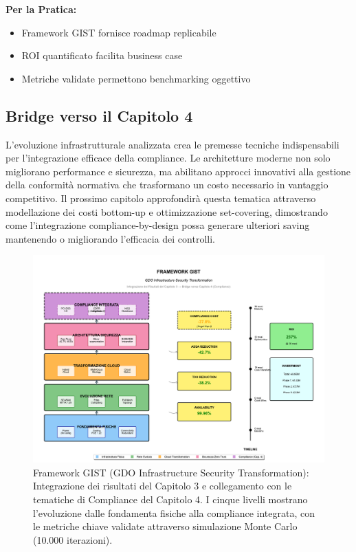 \textbf{Per la Pratica:}
\begin{itemize}
    \item Framework GIST fornisce roadmap replicabile
    \item ROI quantificato facilita business case
    \item Metriche validate permettono benchmarking oggettivo
\end{itemize}

\subsection{Bridge verso il Capitolo 4}

L'evoluzione infrastrutturale analizzata crea le premesse tecniche indispensabili per l'integrazione efficace della compliance. Le architetture moderne non solo migliorano performance e sicurezza, ma abilitano approcci innovativi alla gestione della conformità normativa che trasformano un costo necessario in vantaggio competitivo. Il prossimo capitolo approfondirà questa tematica attraverso modellazione dei costi bottom-up e ottimizzazione set-covering, dimostrando come l'integrazione compliance-by-design possa generare ulteriori saving mantenendo o migliorando l'efficacia dei controlli.

\begin{figure}[htbp]
\centering
\includegraphics[width=\textwidth]{thesis_figures/cap3/figura_3_6_framework_integrato.pdf}
\caption{Framework GIST (GDO Infrastructure Security Transformation): Integrazione dei risultati del Capitolo 3 e collegamento con le tematiche di Compliance del Capitolo 4. I cinque livelli mostrano l'evoluzione dalle fondamenta fisiche alla compliance integrata, con le metriche chiave validate attraverso simulazione Monte Carlo (10.000 iterazioni).}
\label{fig:framework_gist}
\end{figure}

\clearpage
\printbibliography[
    heading=subbibliography,
    title={Riferimenti Bibliografici del Capitolo 3},
]

\endrefsection